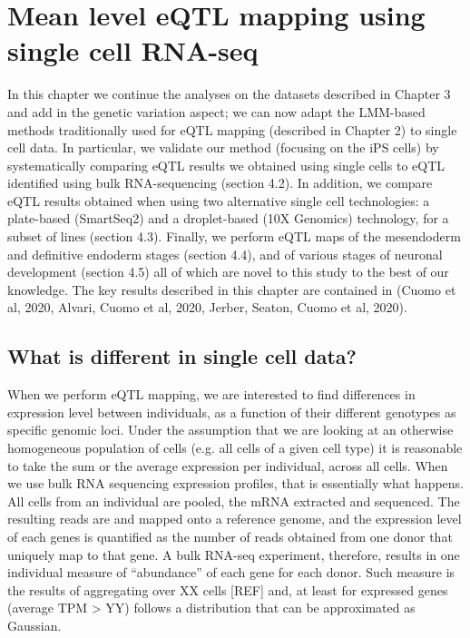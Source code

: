 
\chapter{Mean level eQTL mapping using single cell RNA-seq}

In this chapter we continue the analyses on the datasets described in Chapter 3 and add in the genetic variation aspect; we can now adapt the LMM-based methods traditionally used for eQTL mapping (described in Chapter 2) to single cell data. 
In particular, we validate our method (focusing on the iPS cells) by systematically comparing eQTL results we obtained using single cells to eQTL identified using bulk RNA-sequencing (section 4.2). 
In addition, we compare eQTL results obtained when using two alternative single cell technologies: a plate-based (SmartSeq2) and a droplet-based (10X Genomics) technology, for a subset of lines (section 4.3). 
Finally, we perform eQTL maps of the mesendoderm and definitive endoderm stages (section 4.4), and of various stages of neuronal development (section 4.5) all of which are novel to this study to the best of our knowledge. 
The key results described in this chapter are contained in (Cuomo et al, 2020, Alvari, Cuomo et al, 2020, Jerber, Seaton, Cuomo et al, 2020).

\section{What is different in single cell data?}

When we perform eQTL mapping, we are interested to find differences in expression level between individuals, as a function of their different genotypes as specific genomic loci. 
Under the assumption that we are looking at an otherwise homogeneous population of cells (e.g. all cells of a given cell type) it is reasonable to take the sum or the average expression per individual, across all cells.
When we use bulk RNA sequencing expression profiles, that is essentially what happens. 
All cells from an individual are pooled, the mRNA extracted and sequenced. 
The resulting reads are and mapped onto a reference genome, and the expression level of each genes is quantified as the number of reads obtained from one donor that uniquely map to that gene. 
A bulk RNA-seq experiment, therefore, results in one individual measure of “abundance” of each gene for each donor. 
Such measure is the results of aggregating over XX cells [REF] and, at least for expressed genes (average TPM > YY) follows a distribution that can be approximated as Gaussian.

